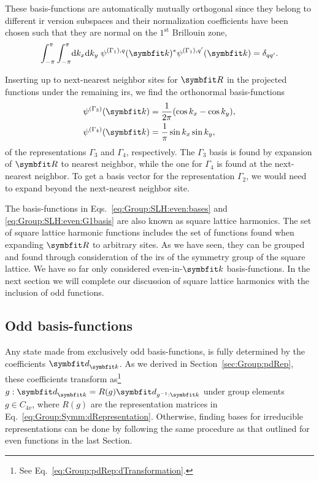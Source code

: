 These basis-functions are automatically
mutually orthogonal since they belong to different \ac{ir} version subspaces and their normalization coefficients have been chosen such that they are normal
on the $1^\text{st}$ Brillouin zone, \ie
\begin{equation}
    \label{eq:Group:SLH:even:G1orthonormal}
    \int_{-\pi}^\pi\int_{-\pi}^\pi\!\textrm{d}k_x\textrm{d}k_y\;\psi^{(\Gamma_1),q}(\v{k})^\ast\psi^{(\Gamma_1),q'}(\v{k}) = \delta_{qq'}.
\end{equation}

Inserting up to next-nearest neighbor sites for $\v{R}$ in the projected functions under the remaining \ac{ir}s, we find the orthonormal basis-functions
\begin{subequations}
    \label{eq:Group:SLH:even:bases}
    \begin{align}
        \label{eq:Group:SLH:even:bases:G3}
        \psi^{(\Gamma_3)}(\v{k}) &= \frac{1}{2\pi}(\cos k_x - \cos k_y),\\
        \label{eq:Group:SLH:even:bases:G4}
        \psi^{(\Gamma_4)}(\v{k}) &= \frac{1}{\pi}\sin k_x\sin k_y,
    \end{align}
\end{subequations}
of the representations $\Gamma_3$ and $\Gamma_4$, respectively. The $\Gamma_3$ basis is found by expansion of $\v{R}$ to nearest neighbor, while the one for $\Gamma_4$
is found at the next-nearest neighbor. To get a basis vector for the representation $\Gamma_2$, we would need to expand beyond the next-nearest neighbor site.

The basis-functions in Eqs.~\eqref{eq:Group:SLH:even:bases} and \eqref{eq:Group:SLH:even:G1basis} are also known as square lattice harmonics.
The set of square lattice harmonic functions includes the set of functions found when expanding
$\v{R}$ to arbitrary sites. As we have seen, they can be grouped and found through consideration of the \ac{ir}s of the symmetry group of the
square lattice. We have so far only considered even-in-$\v{k}$ basis-functions. In the next section we will complete our discussion of square lattice harmonics
with the inclusion of odd functions.


\subsection{Odd basis-functions}

Any state made from exclusively odd basis-functions, is fully determined by the coefficients $\v{d}_\v{k}$. As we derived in Section~\ref{sec:Group:pdRep}, these coefficients
transform as\footnote{See Eq.~\eqref{eq:Group:pdRep:dTransformation}.} $g:\v{d}_\v{k} = R(g)\v{d}_{g^{-1}:\v{k}}$
under group elements $g\in C_{4v}$, where $R(g)$ are the representation matrices in Eq.~\eqref{eq:Group:Symm:dRepresentation}.
Otherwise, finding bases for irreducible representations can be done by following the same procedure as that outlined for even functions in the last Section.

